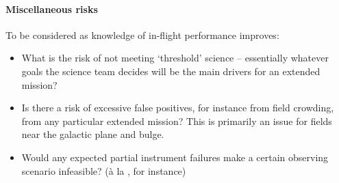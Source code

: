 \paragraph{Miscellaneous risks}
To be considered as knowledge of \tesss in-flight performance improves:
\begin{itemize}
	\item What is the risk of not meeting `threshold' science -- essentially whatever goals the science team decides will be the main drivers for an extended mission?
	\item Is there a risk of excessive false positives, for instance from field crowding, from any particular extended mission? This is primarily an issue for fields near the galactic plane and bulge.
	\item Would any expected partial instrument failures make a certain observing scenario infeasible? (\`a la \ktwo\!, for instance)
\end{itemize}

